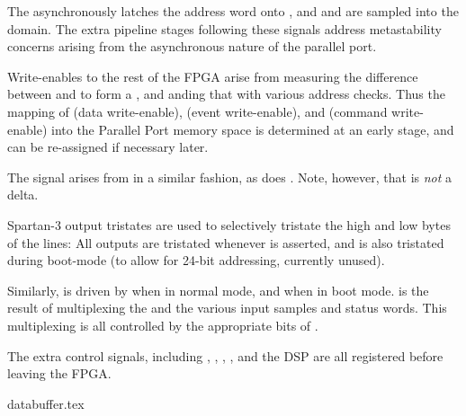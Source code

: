   
The  asynchronously latches the address word onto
, and  and  are sampled into
the  domain. The extra pipeline stages following these
signals address metastability concerns arising from the asynchronous
nature of the parallel port.
  
Write-enables to the rest of the FPGA arise from measuring the
difference between  and  to form a
, and anding that with various address checks. Thus
the mapping of  (data write-enable),  (event
write-enable), and  (command write-enable) into the
Parallel Port memory space is determined at an early stage, and can be
re-assigned if necessary later.
    
The signal  arises from  in a similar
fashion, as does . Note, however, that  is
\textit{not} a delta.
  
Spartan-3 output tristates are used to selectively tristate the high
and low bytes of the  lines: All outputs are tristated
whenever  is asserted, and  is also
tristated during boot-mode (to allow for 24-bit addressing, currently
unused).
  
Similarly,  is driven by  when in
normal mode, and  when in boot mode. is
the result of multiplexing the  and the various
input samples and status words. This multiplexing is all controlled by
the appropriate bits of .


The extra control signals, including , ,
, , and the DSP  are all
registered before leaving the FPGA.
    

{databuffer.tex}

